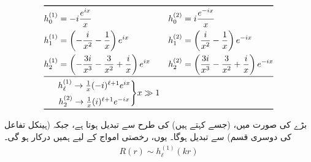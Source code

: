 \begin{table}[h!]
\centering
\caption{کروی ہینکل تفاعلات $h_{\ell}^{(1)}(x)$ اور $h_{\ell}^{(2)}(x)$}
\label{جدول_بکھراو_ہینکل_تفاعلات}
\begin{align*}
\toprule
h_0^{(1)}& = -i\frac{e^{ix}}{x} & & h_0^{(2)} = i\frac{e^{-ix}}{x} \\
h_1^{(1)} &= \left(-\frac{i}{x^2}-\frac{1}{x}\right)e^{ix} & & h_1^{(2)} = \left(\frac{i}{x^2}-\frac{1}{x}\right)e^{-ix} \\
h_2^{(1)} &= \left(-\frac{3i}{x^3}-\frac{3}{x^2}+\frac{i}{x}\right)e^{ix} & & h_2^{(2)} = \left(\frac{3i}{x^3}-\frac{3}{x^2}+\frac{i}{x}\right)e^{-ix}\\
\midrule
&\begin{matrix}
 	h_{\ell}^{(1)}\rightarrow\frac{1}{x}(-i)^{\ell+1}e^{ix} \\[0.5em]
 	h_2^{(2)}\rightarrow\frac{1}{x}(i)^{\ell+1}e^{-ix}
 \end{matrix}
	\Bigg\}x \gg 1\\
\bottomrule
\end{align*}
\end{table}
بڑے  کی صورت میں،  (جسے  کہتے ہیں)  کی طرح سے تبدیل ہوتا ہے، جبکہ  (ہینکل تفاعل کی دوسری قسم)  سے تبدیل ہوگا۔ یوں، رخصتی امواج کے لیے ہمیں  درکار ہو گی۔
\begin{align}
	R(r)\sim h^{(1)}_{\ell}(kr)
\end{align}

